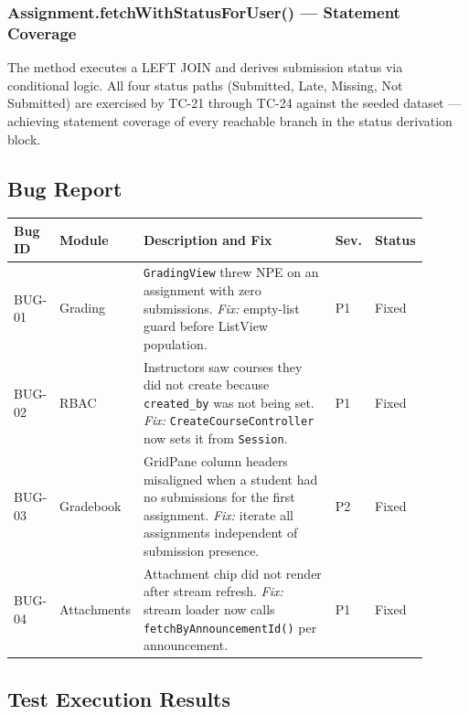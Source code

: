 \documentclass[12pt, a4paper]{article}
\begin{document}
\subsubsection*{Assignment.fetchWithStatusForUser() --- Statement Coverage}
The method executes a LEFT JOIN and derives submission status via conditional
logic. All four status paths (Submitted, Late, Missing, Not Submitted) are
exercised by TC-21 through TC-24 against the seeded dataset --- achieving
statement coverage of every reachable branch in the status derivation block.

\subsection{Bug Report}

\begin{center}\small
\begin{tabular}{@{}p{0.07\linewidth}p{0.11\linewidth}p{0.58\linewidth}p{0.06\linewidth}p{0.08\linewidth}@{}}
  \toprule
  \textbf{Bug ID} & \textbf{Module} & \textbf{Description and Fix} & \textbf{Sev.} & \textbf{Status} \\
  \midrule
  BUG-01 & Grading     & \texttt{GradingView} threw NPE on an assignment with zero submissions. \emph{Fix:} empty-list guard before ListView population.                                            & P1 & \textcolor{success}{Fixed} \\
  BUG-02 & RBAC        & Instructors saw courses they did not create because \texttt{created\_by} was not being set. \emph{Fix:} \texttt{CreateCourseController} now sets it from \texttt{Session}.     & P1 & \textcolor{success}{Fixed} \\
  BUG-03 & Gradebook   & GridPane column headers misaligned when a student had no submissions for the first assignment. \emph{Fix:} iterate all assignments independent of submission presence.        & P2 & \textcolor{success}{Fixed} \\
  BUG-04 & Attachments & Attachment chip did not render after stream refresh. \emph{Fix:} stream loader now calls \texttt{fetchByAnnouncementId()} per announcement. & P1 & \textcolor{success}{Fixed} \\
  \bottomrule
\end{tabular}
\end{center}

\subsection{Test Execution Results}
\end{document}
